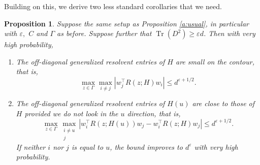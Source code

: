 \documentclass[letterpaper, 10pt, dvipsnames]{article}
\numberwithin{equation}{section}
\DeclareMathOperator{\Tr}{Tr}
\newcommand{\tr}{\Tr}
\renewcommand{\epsilon}{\varepsilon}
\newtheorem{prop}[ccounter]{Proposition}
\theoremstyle{definition}
\begin{document}
Building on this, we derive two less standard corollaries that we need. 
\begin{prop}\label{a:lessusual}
  Suppose the same setup as Proposition \ref{a:usual}, in particular with $\epsilon,$ $C$ and $\Gamma$ as before. Suppose further that $\tr(D^2) \geq \epsilon d$. Then with very high probability, 
  \begin{enumerate}
    \item The off-diagonal generalized resolvent entries of $H$ are small on the contour, that is,
    \begin{equation}\label{a:lessusual1}
      \max_{z \in \Gamma}\max_{i \neq j} |w_j^{\top}R(z ; H)w_i| \leq d^{\epsilon+1/2}.
    \end{equation}
    \item The off-diagonal generalized resolvent entries of $H(u)$ are close to those of $H$ provided we do not look in the $u$ direction, that is,
    \begin{equation}\label{a:lessusual2}
      \max_{z \in \Gamma}\max_{\substack{i \neq u \\ j}} |w_i^{\top}R(z ; H(u)) w_j-w_i^{\top}R(z ; H) w_j| \leq d^{\epsilon+1/2}.
    \end{equation}
    If neither $i$ nor $j$ is equal to $u$, the bound improves to $d^{\epsilon}$ with very high probability.
  \end{enumerate}
\end{prop}
\end{document}

